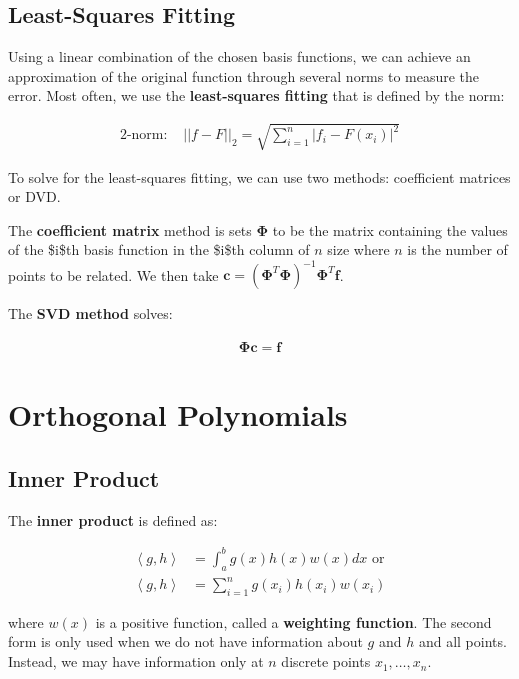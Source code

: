 \documentclass[11pt]{article}
\begin{document}
\subsection{Least-Squares Fitting}
\label{sec:orgc0db5fd}
Using a linear combination of the chosen basis functions, we can achieve an approximation of the original function through several norms to measure the error. Most often, we use the \textbf{least-squares fitting} that is defined by the norm:

\begin{align*}
    2\text{-norm: } &\lvert\lvert f - F \lvert\lvert_{2} = \sqrt{\sum_{i=1}^{n} \lvert f_{i} - F\left(x_{i}\right)\rvert^{2}}
\end{align*}

To solve for the least-squares fitting, we can use two methods: coefficient matrices or DVD.

The \textbf{coefficient matrix} method is sets \(\boldsymbol{\Phi}\) to be the matrix containing the values of the \$i\$th basis function in the \$i\$th column of \(n\) size where \(n\) is the number of points to be related. We then take \(\boldsymbol{c} = \left(\boldsymbol{\Phi}^{T}\boldsymbol{\Phi}\right)^{-1}\boldsymbol{\Phi}^{T}\boldsymbol{f}\).

The \textbf{SVD method} solves:

\begin{align*}
    \boldsymbol{\Phi}\boldsymbol{c} = \boldsymbol{f}
\end{align*}

\section{Orthogonal Polynomials}
\label{sec:org126fa73}
\subsection{Inner Product}
\label{sec:org8a3d8f9}
The \textbf{inner product} is defined as:

\begin{align*}
    \left\langle g,h \right\rangle &= \int_{a}^{b}g\left(x\right)h\left(x\right)w\left(x\right) dx \text{  or} \\
    \left\langle g,h \right\rangle &= \sum_{i=1}^{n}g\left(x_{i}\right)h\left(x_{i}\right)w\left(x_{i}\right)
\end{align*}

where \(w\left(x\right)\) is a positive function, called a \textbf{weighting function}. The second form is only used when we do not have information about \(g\) and \(h\) and all points. Instead, we may have information only at \(n\) discrete points \(x_{1}, \ldots, x_{n}\).
\end{document}
